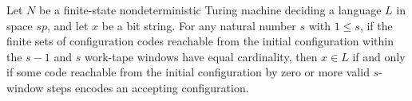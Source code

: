 \begin{theorem}
\label{Complexity.LogProg.ISGen.mem_iff_exists_acc_of_card_eq}
\leanok
{}
Let $N$ be a finite-state nondeterministic Turing machine deciding a language $L$ in
space $sp$, and let $x$ be a bit string. For any natural number $s$ with $1\le s$, if
the finite sets of configuration codes reachable from the initial configuration within
the $s-1$ and $s$ work-tape windows have equal cardinality, then $x\in L$ if and only if
some code reachable from the initial configuration by zero or more valid $s$-window
steps encodes an accepting configuration.
\end{theorem}
